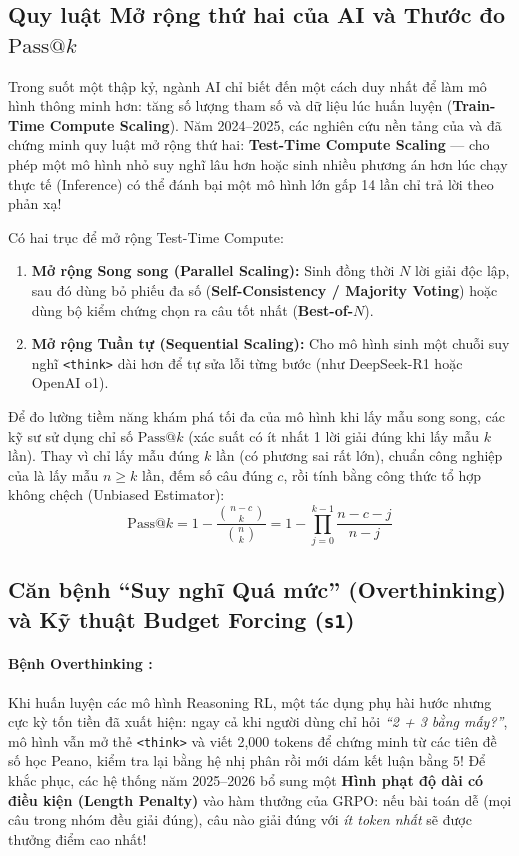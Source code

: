 \subsection{Quy luật Mở rộng thứ hai của AI và Thước đo \texorpdfstring{$\text{Pass@}k$}{Pass@k}}

Trong suốt một thập kỷ, ngành AI chỉ biết đến một cách duy nhất để làm mô hình thông minh hơn: tăng số lượng tham số và dữ liệu lúc huấn luyện (\textbf{Train-Time Compute Scaling}). Năm 2024--2025, các nghiên cứu nền tảng của \citet{snell2024scaling} và \citet{brown2024large} đã chứng minh quy luật mở rộng thứ hai: \textbf{Test-Time Compute Scaling} --- cho phép một mô hình nhỏ suy nghĩ lâu hơn hoặc sinh nhiều phương án hơn lúc chạy thực tế (Inference) có thể đánh bại một mô hình lớn gấp 14 lần chỉ trả lời theo phản xạ!

Có hai trục để mở rộng Test-Time Compute:
\begin{enumerate}
  \item \textbf{Mở rộng Song song (Parallel Scaling):} Sinh đồng thời $N$ lời giải độc lập, sau đó dùng bỏ phiếu đa số (\textbf{Self-Consistency / Majority Voting}) \citep{wang2023self} hoặc dùng bộ kiểm chứng chọn ra câu tốt nhất (\textbf{Best-of-$N$}).
  \item \textbf{Mở rộng Tuần tự (Sequential Scaling):} Cho mô hình sinh một chuỗi suy nghĩ \texttt{<think>} dài hơn để tự sửa lỗi từng bước (như DeepSeek-R1 hoặc OpenAI o1).
\end{enumerate}

Để đo lường tiềm năng khám phá tối đa của mô hình khi lấy mẫu song song, các kỹ sư sử dụng chỉ số \textbf{$\text{Pass@}k$} (xác suất có ít nhất 1 lời giải đúng khi lấy mẫu $k$ lần). Thay vì chỉ lấy mẫu đúng $k$ lần (có phương sai rất lớn), chuẩn công nghiệp của \citet{chen2021evaluating} là lấy mẫu $n \ge k$ lần, đếm số câu đúng $c$, rồi tính bằng công thức tổ hợp không chệch (Unbiased Estimator):
\begin{equation}
  \text{Pass@}k = 1 - \frac{\binom{n - c}{k}}{\binom{n}{k}} = 1 - \prod_{j=0}^{k-1} \frac{n - c - j}{n - j}
  \label{eq:pass_at_k}
\end{equation}

\subsection{Căn bệnh ``Suy nghĩ Quá mức'' (Overthinking) và Kỹ thuật Budget Forcing (\texttt{s1})}

\paragraph{Bệnh Overthinking \citep{chen2025donot}:}
Khi huấn luyện các mô hình Reasoning RL, một tác dụng phụ hài hước nhưng cực kỳ tốn tiền đã xuất hiện: ngay cả khi người dùng chỉ hỏi \textit{``2 + 3 bằng mấy?''}, mô hình vẫn mở thẻ \texttt{<think>} và viết 2,000 tokens để chứng minh từ các tiên đề số học Peano, kiểm tra lại bằng hệ nhị phân rồi mới dám kết luận bằng $5$! Để khắc phục, các hệ thống năm 2025--2026 bổ sung một \textbf{Hình phạt độ dài có điều kiện (Length Penalty)} vào hàm thưởng của GRPO: nếu bài toán dễ (mọi câu trong nhóm đều giải đúng), câu nào giải đúng với \textit{ít token nhất} sẽ được thưởng điểm cao nhất!

